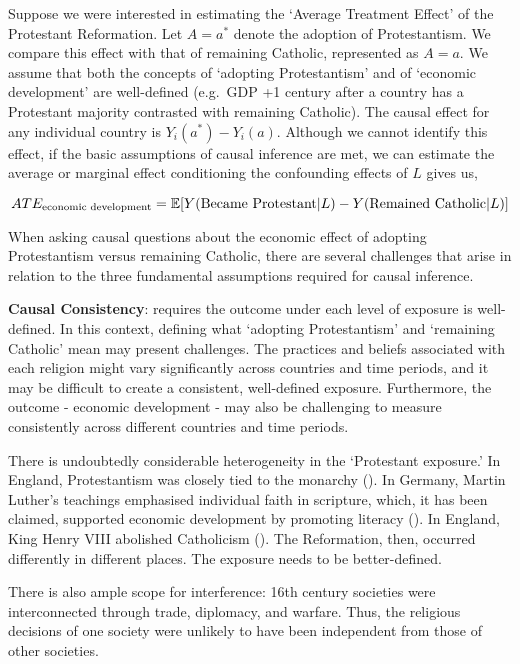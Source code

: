 \documentclass[
  singlecolumn]{article}
\begin{document}
Suppose we were interested in estimating the `Average Treatment Effect'
of the Protestant Reformation. Let \(A = a^*\) denote the adoption of
Protestantism. We compare this effect with that of remaining Catholic,
represented as \(A = a\). We assume that both the concepts of `adopting
Protestantism' and of `economic development' are well-defined (e.g.~GDP
+1 century after a country has a Protestant majority contrasted with
remaining Catholic). The causal effect for any individual country is
\(Y_i(a^*) - Y_i(a)\). Although we cannot identify this effect, if the
basic assumptions of causal inference are met, we can estimate the
average or marginal effect conditioning the confounding effects of \(L\)
gives us,

\[ATE_{\textnormal{economic~development}} = \mathbb{E}[Y(\textnormal{Became~Protestant}|L) - Y(\textnormal{Remained~Catholic}|L)]\]

When asking causal questions about the economic effect of adopting
Protestantism versus remaining Catholic, there are several challenges
that arise in relation to the three fundamental assumptions required for
causal inference.

\textbf{Causal Consistency}: requires the outcome under each level of
exposure is well-defined. In this context, defining what `adopting
Protestantism' and `remaining Catholic' mean may present challenges. The
practices and beliefs associated with each religion might vary
significantly across countries and time periods, and it may be difficult
to create a consistent, well-defined exposure. Furthermore, the outcome
- economic development - may also be challenging to measure consistently
across different countries and time periods.

There is undoubtedly considerable heterogeneity in the `Protestant
exposure.' In England, Protestantism was closely tied to the monarchy
(). In Germany, Martin
Luther's teachings emphasised individual faith in scripture, which, it
has been claimed, supported economic development by promoting literacy
(). In England,
King Henry VIII abolished Catholicism
(). The Reformation, then,
occurred differently in different places. The exposure needs to be
better-defined.

There is also ample scope for interference: 16th century societies were
interconnected through trade, diplomacy, and warfare. Thus, the
religious decisions of one society were unlikely to have been
independent from those of other societies.
\end{document}
